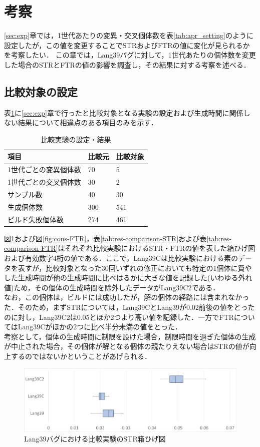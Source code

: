 \documentclass[uplatex,dvipdfmx,a4paper]{jsarticle}
\begin{document}
\section{考察}\label{sec:cons}
\ref{sec:exp}章では，1世代あたりの変異・交叉個体数を表\ref{tab:apr_setting}のように設定したが，この値を変更することでSTRおよびFTRの値に変化が見られるかを考察したい．
この章では，Lang39バグに対して，1世代あたりの個体数を変更した場合のSTRとFTRの値の影響を調査し，その結果に対する考察を述べる．
\subsection{比較対象の設定}
表\ref{tab:comparison}に\ref{sec:exp}章で行ったと比較対象となる実験の設定および生成時間に関係しない結果について相違点のある項目のみを示す．
\begin{table}[b]
  \centering
  \caption{比較実験の設定・結果}
  \label{tab:comparison}
  \begin{tabular}{l|ll} \hline\hline
    項目 & 比較元         & 比較対象                           \\\hline
    1世代ごとの変異個体数 & 70 & 5 \\
    1世代ごとの交叉個体数 & 30 & 2 \\
    サンプル数 & 40 & 30 \\
    生成個体数 & 300 & 541 \\
    ビルド失敗個体数 & 274 & 461 \\\hline\hline
  \end{tabular}
\end{table}
図\ref{fig:cons-STR}および図\ref{fig:cons-FTR}，表\ref{tab:res-comparison-STR}および表\ref{tab:res-comparison-FTR}はそれぞれ比較実験におけるSTR・FTRの値を表した箱ひげ図および有効数字4桁の値である．ここで，Lang39Cは比較実験における素のデータを表すが，比較対象となった30回いずれの修正においても特定の1個体に費やした生成時間が他の生成時間に比べはるかに大きな値を記録した(いわゆる外れ値)ため，その個体の生成時間を除外したデータがLang39C2である．\\
なお，この個体は，ビルドには成功したが，解の個体の経路には含まれなかった．そのため，まずSTRについては，Lang39CとLang39が0.02前後の値をとったのに対し，Lang39C2は0.05とほか2つより高い値を記録した．一方でFTRについてはLang39Cがほかの2つに比べ半分未満の値をとった．\\
考察として，個体の生成時間に制限を設けた場合，制限時間を過ぎた個体の生成が中止された場合，その個体が解となる個体の親たりえない場合はSTRの値が向上するのではないかということがあげられる．
\begin{figure}[t]
  \centering
  \includegraphics[width=\linewidth]{fig/cons_STR.png}
  \caption{Lang39バグにおける比較実験のSTR箱ひげ図}
  \label{fig:cons-STR}
\end{figure}
\end{document}
